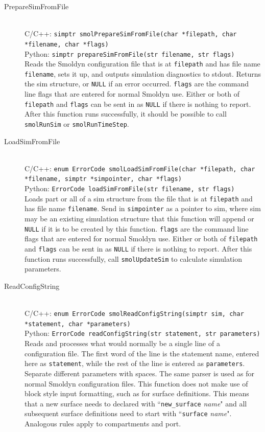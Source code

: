 \documentclass {scrbook}
\newcommand {\ttt} {\texttt}
\begin{document}
\begin{description}

\item[PrepareSimFromFile]
\hfill \\
C/C++: \ttt{simptr smolPrepareSimFromFile(char *filepath, char *filename, char *flags)}\\
Python: \ttt{simptr prepareSimFromFile(str filename, str flags)}\\
Reads the Smoldyn configuration file that is at \ttt{filepath} and has file name \ttt{filename}, sets it up, and outputs simulation diagnostics to stdout. Returns the sim structure, or \ttt{NULL} if an error occurred. \ttt{flags} are the command line flags that are entered for normal Smoldyn use. Either or both of \ttt{filepath} and \ttt{flags} can be sent in as \ttt{NULL} if there is nothing to report. After this function runs successfully, it should be possible to call \ttt{smolRunSim} or \ttt{smolRunTimeStep}.

\item[LoadSimFromFile]
\hfill \\
C/C++: \ttt{enum ErrorCode smolLoadSimFromFile(char *filepath, char *filename, simptr *simpointer, char *flags)}\\
Python: \ttt{ErrorCode loadSimFromFile(str filename, str flags)}\\
Loads part or all of a sim structure from the file that is at \ttt{filepath} and has file name \ttt{filename}. Send in \ttt{simpointer} as a pointer to sim, where sim may be an existing simulation structure that this function will append or \ttt{NULL} if it is to be created by this function. \ttt{flags} are the command line flags that are entered for normal Smoldyn use. Either or both of \ttt{filepath} and \ttt{flags} can be sent in as \ttt{NULL} if there is nothing to report. After this function runs successfully, call \ttt{smolUpdateSim} to calculate simulation parameters.

\item[ReadConfigString]
\hfill \\
C/C++: \ttt{enum ErrorCode smolReadConfigString(simptr sim, char *statement, char *parameters)}\\
Python: \ttt{ErrorCode readConfigString(str statement, str parameters)}\\
Reads and processes what would normally be a single line of a configuration file. The first word of the line is the statement name, entered here as \ttt{statement}, while the rest of the line is entered as \ttt{parameters}. Separate different parameters with spaces. The same parser is used as for normal Smoldyn configuration files. This function does not make use of block style input formatting, such as for surface definitions. This means that a new surface needs to declared with ``\ttt{new\_surface} \emph{name}" and all subsequent surface definitions need to start with ``\ttt{surface} \emph{name}". Analogous rules apply to compartments and port.

\end{description}
\end{document}
